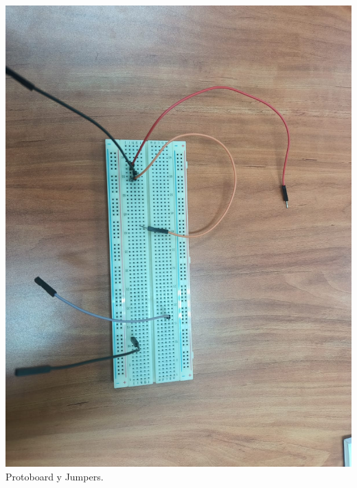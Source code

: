 \documentclass[10pt]{article}
\begin{document}
\begin{multicols}{2}
\begin{center}
	\includegraphics[scale = 0.1]{Imagenes/Material/Protoboard y jumper.jpeg}\\
	Protoboard y Jumpers.


\end{center}
\end{multicols}
\end{document}
